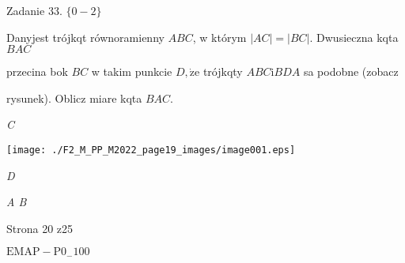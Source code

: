 \documentclass[a4paper,12pt]{article}
\begin{document}
Zadanie 33. $\{0-2\}$

Danyjest trójkqt równoramienny $ABC$, w którym $|AC|=|BC|$. Dwusieczna kqta $BAC$

przecina bok $BC$ w takim punkcie $D, \dot{\mathrm{z}}\mathrm{e}$ trójkqty $ABC \mathrm{i} BDA$ sa podobne (zobacz

rysunek). Oblicz miare kqta $BAC.$

{\it C}
\begin{center}
\texttt{[image: ./F2\_M\_PP\_M2022\_page19\_images/image001.eps]}
\end{center}
{\it D}

{\it A B}

Strona 20 z25

$\mathrm{E}\mathrm{M}\mathrm{A}\mathrm{P}-\mathrm{P}0_{-}100$
\end{document}
